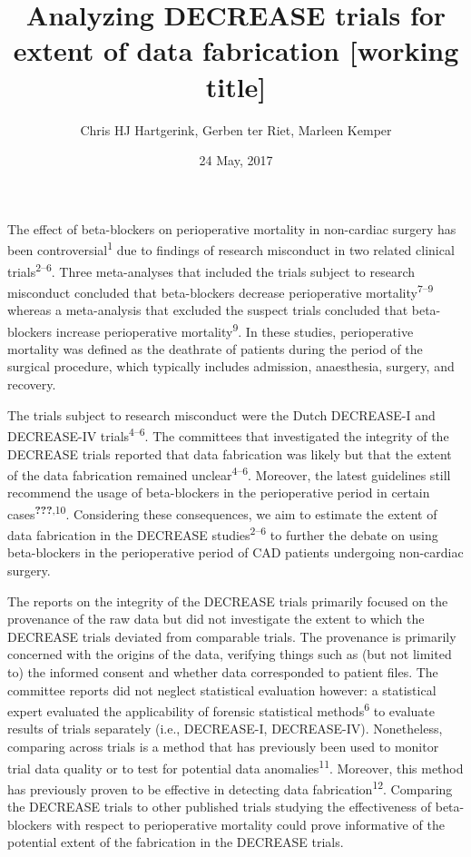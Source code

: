 \documentclass[]{article}
\title{Analyzing DECREASE trials for extent of data fabrication {[}working
title{]}}
\author{Chris HJ Hartgerink, Gerben ter Riet, Marleen Kemper}
\date{24 May, 2017}
\begin{document}
\maketitle

The effect of beta-blockers on perioperative mortality in non-cardiac
surgery has been controversial\textsuperscript{1} due to findings of
research misconduct in two related clinical
trials\textsuperscript{2--6}. Three meta-analyses that included the
trials subject to research misconduct concluded that beta-blockers
decrease perioperative mortality\textsuperscript{7--9} whereas a
meta-analysis that excluded the suspect trials concluded that
beta-blockers increase perioperative mortality\textsuperscript{9}. In
these studies, perioperative mortality was defined as the deathrate of
patients during the period of the surgical procedure, which typically
includes admission, anaesthesia, surgery, and recovery.

The trials subject to research misconduct were the Dutch DECREASE-I and
DECREASE-IV trials\textsuperscript{4--6}. The committees that
investigated the integrity of the DECREASE trials reported that data
fabrication was likely but that the extent of the data fabrication
remained unclear\textsuperscript{4--6}. Moreover, the latest guidelines
still recommend the usage of beta-blockers in the perioperative period
in certain cases\textsuperscript{{\textbf{???}},10}. Considering these
consequences, we aim to estimate the extent of data fabrication in the
DECREASE studies\textsuperscript{2--6} to further the debate on using
beta-blockers in the perioperative period of CAD patients undergoing
non-cardiac surgery.

The reports on the integrity of the DECREASE trials primarily focused on
the provenance of the raw data but did not investigate the extent to
which the DECREASE trials deviated from comparable trials. The
provenance is primarily concerned with the origins of the data,
verifying things such as (but not limited to) the informed consent and
whether data corresponded to patient files. The committee reports did
not neglect statistical evaluation however: a statistical expert
evaluated the applicability of forensic statistical
methods\textsuperscript{6} to evaluate results of trials separately
(i.e., DECREASE-I, DECREASE-IV). Nonetheless, comparing across trials is
a method that has previously been used to monitor trial data quality or
to test for potential data anomalies\textsuperscript{11}. Moreover, this
method has previously proven to be effective in detecting data
fabrication\textsuperscript{12}. Comparing the DECREASE trials to other
published trials studying the effectiveness of beta-blockers with
respect to perioperative mortality could prove informative of the
potential extent of the fabrication in the DECREASE trials.
\end{document}
